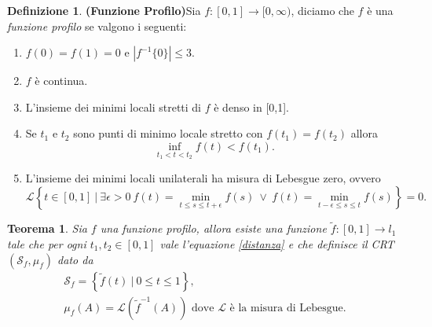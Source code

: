 \documentclass[11pt, twoside]{report}
\newcommand{\Ss}{\mathscr{S}}
\theoremstyle{definition}
\newtheorem{definizione}{Definizione}[chapter]
\theoremstyle{plain}
\newtheorem{teo}{Teorema}[chapter]
\theoremstyle{remark}
\numberwithin{equation}{chapter}
\begin{document}
\begin{definizione}{\textbf{(Funzione Profilo)}}\label{prof_func}
Sia $f:[0,1]\longrightarrow[0,\infty)$, diciamo che $f$ è una \textit{funzione profilo} se valgono i seguenti:
\begin{enumerate}
\item $f(0)=f(1)=0$ e $\left|f^{-1}\{0\}\right|\leq 3$.

\item $f$ è continua.

\item L'insieme dei minimi locali stretti di $f$ è denso in [0,1].

\item Se $t_1$ e $t_2$ sono punti di minimo locale stretto con $f(t_1)=f(t_2)$ allora 
$$\inf\limits_{t_1<t<t_2} f(t) < f(t_1).$$

\item L'insieme dei minimi locali unilaterali ha misura di Lebesgue zero, ovvero 
$$\mathscr{L}\left\{t \in [0,1] \ \bigg| \ \exists \epsilon>0 \ f(t)= \min\limits_{t\leq s \leq t+\epsilon} f(s) \ \lor \ f(t)= \min\limits_{t-\epsilon \leq s \leq t} f(s) \right\}=0.$$

\end{enumerate}
\end{definizione}

\begin{teo} \label{teo_funzio_profilo}
Sia $f$ una funzione profilo, allora esiste una funzione $\tilde{f}:[0,1]\longrightarrow l_1$ tale che per ogni $t_1,t_2 \in [0,1]$ vale l'equazione \eqref{distanza} e che definisce il CRT $(\Ss_f, \mu_f)$ dato da 
\begin{gather}
\Ss_f=\left\{\tilde{f}(t)\ \bigg| \ 0\leq t \leq 1 \right\}, \nonumber \\
\mu_f(A)=\mathscr{L}\left(\tilde{f}^{-1}(A)\right) \text{ dove } \mathscr{L} \text{ è la misura di Lebesgue}. \nonumber 
\end{gather}
\end{teo}
\end{document}

